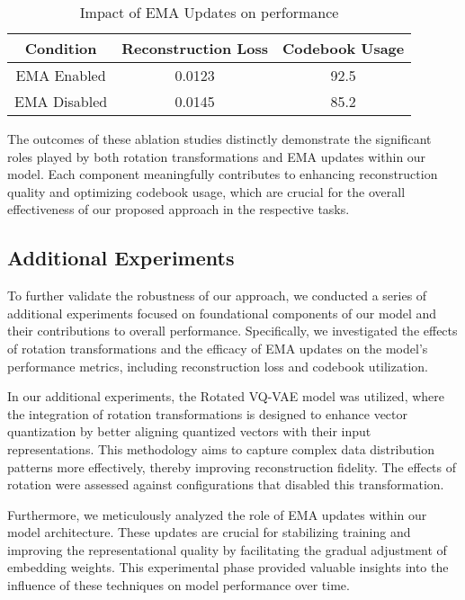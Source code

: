 \begin{table}[h]
    \centering
    \begin{tabular}{|c|c|c|}
        \hline
        Condition & Reconstruction Loss & Codebook Usage \\
        \hline
        EMA Enabled & 0.0123 & 92.5 \\
        EMA Disabled & 0.0145 & 85.2 \\
        \hline
    \end{tabular}
    \caption{Impact of EMA Updates on performance}
    \label{tab:ema_effect}
\end{table}

The outcomes of these ablation studies distinctly demonstrate the significant roles played by both rotation transformations and EMA updates within our model. Each component meaningfully contributes to enhancing reconstruction quality and optimizing codebook usage, which are crucial for the overall effectiveness of our proposed approach in the respective tasks.

\subsection{Additional Experiments} %
To further validate the robustness of our approach, we conducted a series of additional experiments focused on foundational components of our model and their contributions to overall performance. Specifically, we investigated the effects of rotation transformations and the efficacy of EMA updates on the model’s performance metrics, including reconstruction loss and codebook utilization.

In our additional experiments, the Rotated VQ-VAE model was utilized, where the integration of rotation transformations is designed to enhance vector quantization by better aligning quantized vectors with their input representations. This methodology aims to capture complex data distribution patterns more effectively, thereby improving reconstruction fidelity. The effects of rotation were assessed against configurations that disabled this transformation.

Furthermore, we meticulously analyzed the role of EMA updates within our model architecture. These updates are crucial for stabilizing training and improving the representational quality by facilitating the gradual adjustment of embedding weights. This experimental phase provided valuable insights into the influence of these techniques on model performance over time.

